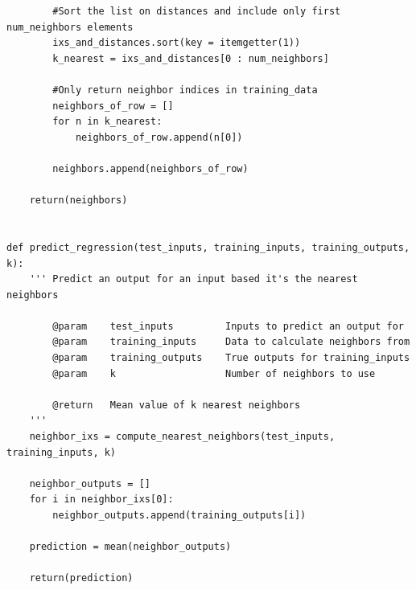 \documentclass[a4paper]{article}
\begin{document}
\begin{lstlisting}
        #Sort the list on distances and include only first num_neighbors elements
        ixs_and_distances.sort(key = itemgetter(1))
        k_nearest = ixs_and_distances[0 : num_neighbors]

        #Only return neighbor indices in training_data
        neighbors_of_row = []
        for n in k_nearest:
            neighbors_of_row.append(n[0])

        neighbors.append(neighbors_of_row)

    return(neighbors)


def predict_regression(test_inputs, training_inputs, training_outputs, k):
    ''' Predict an output for an input based it's the nearest neighbors

        @param    test_inputs         Inputs to predict an output for
        @param    training_inputs     Data to calculate neighbors from
        @param    training_outputs    True outputs for training_inputs
        @param    k                   Number of neighbors to use

        @return   Mean value of k nearest neighbors
    '''
    neighbor_ixs = compute_nearest_neighbors(test_inputs, training_inputs, k)
        
    neighbor_outputs = []
    for i in neighbor_ixs[0]:
        neighbor_outputs.append(training_outputs[i])

    prediction = mean(neighbor_outputs)

    return(prediction)
\end{lstlisting}
\end{document}

